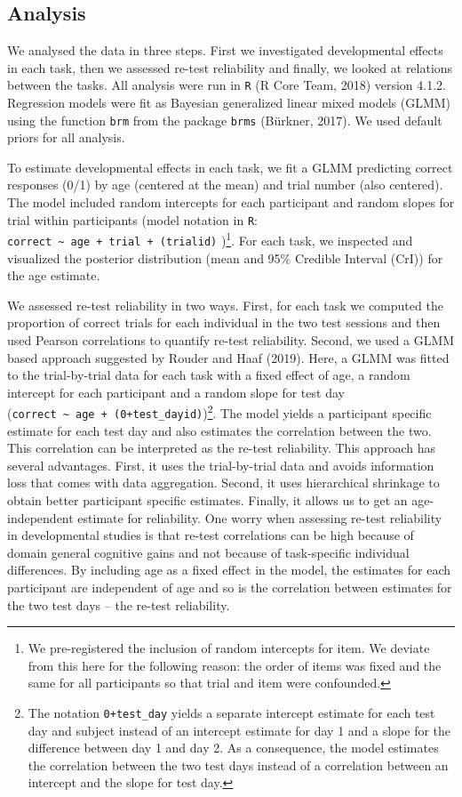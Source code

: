 \documentclass[
  man,floatsintext]{apa6}
\begin{document}
\hypertarget{analysis}{%
\subsection{Analysis}\label{analysis}}

We analysed the data in three steps. First we investigated developmental effects in each task, then we assessed re-test reliability and finally, we looked at relations between the tasks. All analysis were run in \texttt{R} (R Core Team, 2018) version 4.1.2. Regression models were fit as Bayesian generalized linear mixed models (GLMM) using the function \texttt{brm} from the package \texttt{brms} (Bürkner, 2017). We used default priors for all analysis.

To estimate developmental effects in each task, we fit a GLMM predicting correct responses (0/1) by age (centered at the mean) and trial number (also centered). The model included random intercepts for each participant and random slopes for trial within participants (model notation in \texttt{R}: \texttt{correct\ \textasciitilde{}\ age\ +\ trial\ +\ (trial\textbar{}id)} )\footnote{We pre-registered the inclusion of random intercepts for item. We deviate from this here for the following reason: the order of items was fixed and the same for all participants so that trial and item were confounded.}. For each task, we inspected and visualized the posterior distribution (mean and 95\% Credible Interval (CrI)) for the age estimate.

We assessed re-test reliability in two ways. First, for each task we computed the proportion of correct trials for each individual in the two test sessions and then used Pearson correlations to quantify re-test reliability. Second, we used a GLMM based approach suggested by Rouder and Haaf (2019). Here, a GLMM was fitted to the trial-by-trial data for each task with a fixed effect of age, a random intercept for each participant and a random slope for test day (\texttt{correct\ \textasciitilde{}\ age\ +\ (0+test\_day\textbar{}id)})\footnote{The notation \texttt{0+test\_day} yields a separate intercept estimate for each test day and subject instead of an intercept estimate for day 1 and a slope for the difference between day 1 and day 2. As a consequence, the model estimates the correlation between the two test days instead of a correlation between an intercept and the slope for test day.}. The model yields a participant specific estimate for each test day and also estimates the correlation between the two. This correlation can be interpreted as the re-test reliability. This approach has several advantages. First, it uses the trial-by-trial data and avoids information loss that comes with data aggregation. Second, it uses hierarchical shrinkage to obtain better participant specific estimates. Finally, it allows us to get an age-independent estimate for reliability. One worry when assessing re-test reliability in developmental studies is that re-test correlations can be high because of domain general cognitive gains and not because of task-specific individual differences. By including age as a fixed effect in the model, the estimates for each participant are independent of age and so is the correlation between estimates for the two test days -- the re-test reliability.
\end{document}
